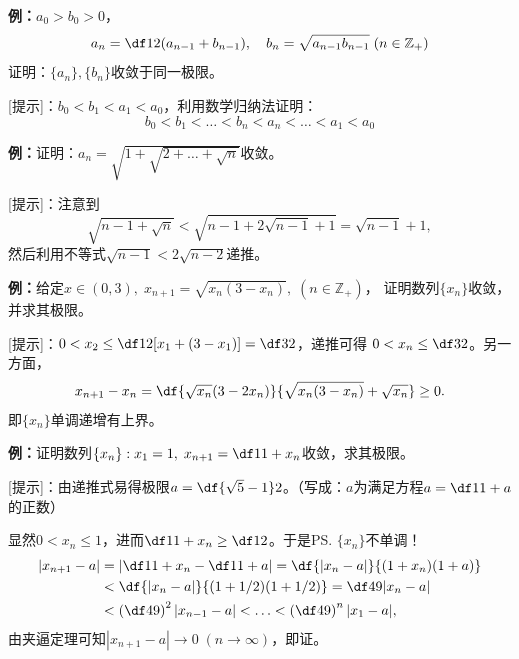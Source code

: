 {\bf 例：}$a_0>b_0>0$，
$$a_n=\df12(a_{n-1}+b_{n-1}),\quad
b_n=\sqrt{a_{n-1}b_{n-1}}\;(n\in\mathbb{Z}_+)$$
证明：$\{a_n\},\{b_n\}$收敛于同一极限。

[提示]：$b_0<b_1<a_1<a_0$，利用数学归纳法证明：
$$b_0<b_1<\ldots<b_n<a_n<\ldots<a_1<a_0$$

{\bf 例：}证明：$a_n=\sqrt{1+\sqrt{2+\ldots+\sqrt{n}}}$收敛。

[提示]：注意到
$$\sqrt{n-1+\sqrt n}<\sqrt{n-1+2\sqrt{n-1}+1}=\sqrt{n-1}+1,$$
然后利用不等式$\sqrt{n-1}<2\sqrt{n-2}$递推。

{\bf 例：}给定$x\in(0,3),\; x_{n+1}=\sqrt{x_n(3-x_n)},\;(n\in\mathbb{Z}_+)$，
证明数列$\{x_n\}$收敛，并求其极限。

[提示]：$0<x_2\leq\df12[x_1+(3-x_1)]=\df32$，递推可得
$0<x_n\leq\df32$。另一方面，
$$x_{n+1}-x_n=\df{\sqrt{x_n}(3-2x_n)}{\sqrt{x_n(3-x_n)}+\sqrt{x_n}}\geq 0.$$
即$\{x_n\}$单调递增有上界。

{\bf 例：}证明数列$\{x_n\}:x_1=1,\;x_{n+1}=\df1{1+x_n}$收敛，求其极限。

[提示]：由递推式易得极限$a=\df{\sqrt5-1}2$。（写成：$a$为满足方程$a=\df1{1+a}$的正数）

显然$0<x_n\leq1$，进而$\df1{1+x_n}\geq\df12$。于是\ps{$\{x_n\}$不单调！}
\begin{align}
	|x_{n+1}-a|&=\left|\df1{1+x_n}-\df1{1+a}\right|=\df{|x_n-a|}{(1+x_n)(1+a)}\notag\\
	&<\df{|x_n-a|}{(1+1/2)(1+1/2)}=\df49|x_n-a|\notag\\
	&<\left(\df49\right)^2|x_{n-1}-a|<\ldots<\left(\df49\right)^{n}|x_1-a|,\notag
\end{align}
由夹逼定理可知$|x_{n+1}-a|\to0\;(n\to\infty)$，即证。

